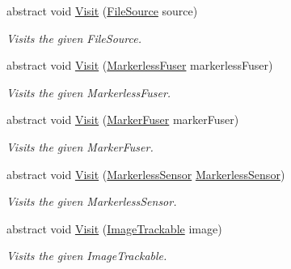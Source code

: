 \begin{DoxyCompactItemize}
abstract void \hyperlink{class_a_rdev_kit_1_1_controller_1_1_project_controller_1_1_abstract_project_visitor_a57f6cd714839140a46e4d68a29c65287}{Visit} (\hyperlink{class_a_rdev_kit_1_1_model_1_1_project_1_1_file_source}{File\-Source} source)
\begin{DoxyCompactList}\small\item\em Visits the given File\-Source. \end{DoxyCompactList}\item 
abstract void \hyperlink{class_a_rdev_kit_1_1_controller_1_1_project_controller_1_1_abstract_project_visitor_a81cd1e82508e62b748421a2e3f128fa2}{Visit} (\hyperlink{class_a_rdev_kit_1_1_model_1_1_project_1_1_markerless_fuser}{Markerless\-Fuser} markerless\-Fuser)
\begin{DoxyCompactList}\small\item\em Visits the given Markerless\-Fuser. \end{DoxyCompactList}\item 
abstract void \hyperlink{class_a_rdev_kit_1_1_controller_1_1_project_controller_1_1_abstract_project_visitor_a162cb32ccf792db44d5cb92604d1f799}{Visit} (\hyperlink{class_a_rdev_kit_1_1_model_1_1_project_1_1_marker_fuser}{Marker\-Fuser} marker\-Fuser)
\begin{DoxyCompactList}\small\item\em Visits the given Marker\-Fuser. \end{DoxyCompactList}\item 
abstract void \hyperlink{class_a_rdev_kit_1_1_controller_1_1_project_controller_1_1_abstract_project_visitor_ab954e7db5de1aafc57e082020eba3f3b}{Visit} (\hyperlink{class_a_rdev_kit_1_1_model_1_1_project_1_1_markerless_sensor}{Markerless\-Sensor} \hyperlink{class_a_rdev_kit_1_1_model_1_1_project_1_1_markerless_sensor}{Markerless\-Sensor})
\begin{DoxyCompactList}\small\item\em Visits the given Markerless\-Sensor. \end{DoxyCompactList}\item 
abstract void \hyperlink{class_a_rdev_kit_1_1_controller_1_1_project_controller_1_1_abstract_project_visitor_a70f8dcc9540bfd0a0d49ac4638898e7a}{Visit} (\hyperlink{class_a_rdev_kit_1_1_model_1_1_project_1_1_image_trackable}{Image\-Trackable} image)
\begin{DoxyCompactList}\small\item\em Visits the given Image\-Trackable. \end{DoxyCompactList}\item 

\end{DoxyCompactItemize}

